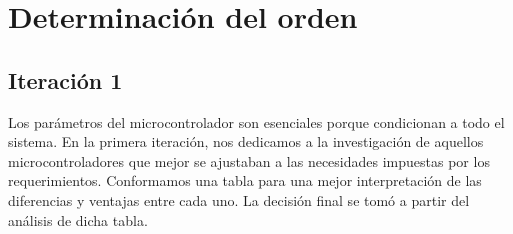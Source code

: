 

\section{Determinación del orden} %
\label{it0:sec:determinacion_del_orden}

\subsection{Iteración 1} %
\label{sub:iteracion_1}

Los parámetros del microcontrolador son esenciales porque condicionan a todo el sistema. En la primera iteración, nos dedicamos a la investigación de aquellos microcontroladores que mejor se ajustaban a las necesidades impuestas por los requerimientos. Conformamos una tabla para una mejor interpretación de las diferencias y ventajas entre cada uno. La decisión final se tomó a partir del análisis de dicha tabla.



